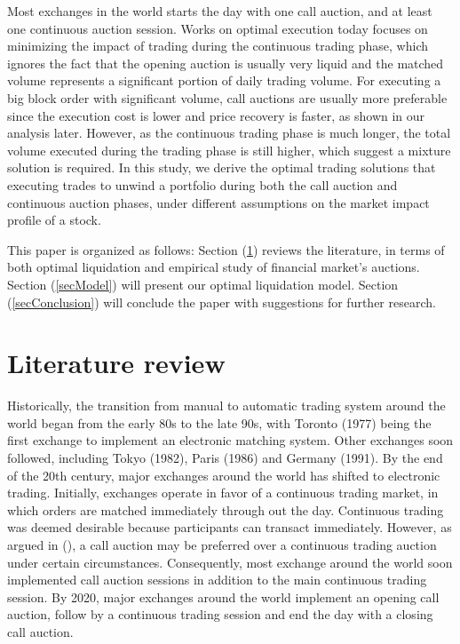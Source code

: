 \documentclass{article}
\begin{document}
Most exchanges in the world starts the day with one call auction, and at least one continuous auction session. Works on optimal execution today focuses on minimizing the impact of trading during the continuous trading phase, which ignores the fact that the opening auction is usually very liquid and the matched volume represents a significant portion of daily trading volume. For executing a big block order with significant volume, call auctions are usually more preferable since the execution cost is lower and price recovery is faster, as shown in our analysis later. However, as the continuous trading phase is much longer, the total volume executed during the trading phase is still higher, which suggest a mixture solution is required. In this study, we derive the optimal trading solutions that executing trades to unwind a portfolio during both the call auction and continuous auction phases, under different assumptions on the market impact profile of a stock.

This paper is organized as follows: Section (\ref{secReview}) reviews the literature, in terms of both optimal liquidation and empirical study of financial market's auctions. Section (\ref{secModel}) will present our optimal liquidation model. Section (\ref{secConclusion}) will conclude the paper with suggestions for further research.

\section{Literature review}\label{secReview}
Historically, the transition from manual to automatic trading system around the world began from the early 80s to the late 90s, with Toronto (1977) being the first exchange to implement an electronic matching system. Other exchanges soon followed, including Tokyo (1982), Paris (1986) and Germany (1991). By the end of the 20th century, major exchanges around the world has shifted to electronic trading. Initially, exchanges operate in favor of a continuous trading market, in which orders are matched immediately through out the day. Continuous trading was deemed desirable because participants can transact immediately. However, as argued in (\cite{Economides1995}), a call auction may be preferred over a continuous trading auction under certain circumstances. Consequently, most exchange around the world soon implemented call auction sessions in addition to the main continuous trading session. By 2020, major exchanges around the world implement an opening call auction, follow by a continuous trading session and end the day with a closing call auction.
\end{document}
